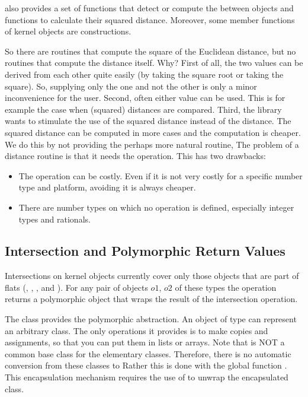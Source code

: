 {\cgal} also provides a set of functions that detect or compute the
 between objects
and functions to calculate their squared
distance.  Moreover, some
member functions of kernel objects are constructions.

So there are routines that compute the square of the Euclidean
distance, but no routines that compute the distance itself. Why?
First of all, the two values can be derived from each other quite
easily (by taking the square root or taking the square). So, supplying
only the one and not the other is only a minor inconvenience for the
user.  Second, often either value can be used. This is for example the
case when (squared) distances are compared.  Third, the library wants
to stimulate the use of the squared distance instead of the distance.
The squared distance can be computed in more cases and the computation
is cheaper.  We do this by not providing the perhaps more natural
routine, The problem of a distance routine is that it needs the
 operation.  This has two drawbacks:
\begin{itemize}
\item The  operation can be costly. Even if it is not
  very costly for a specific number type and platform, avoiding it is
  always cheaper.
\item There are number types on which no  operation is
  defined, especially integer types and rationals.
\end{itemize}

\subsection{Intersection and Polymorphic Return Values}

Intersections on kernel objects currently cover only those objects
that are part of flats (, ,
, and ).  For any pair of objects
$o1$, $o2$ of these types the operation 
returns a polymorphic object that wraps the result of the intersection
operation.

The class  provides the polymorphic abstraction.  An
object  of type  can represent an arbitrary
class. The only operations it provides is to make copies and
assignments, so that you can put them in lists or arrays. Note that
 is NOT a common base class for the elementary classes.
Therefore, there is no automatic conversion from these classes to
 Rather this is done with the global function
. This encapsulation mechanism requires the use of
 to unwrap the encapsulated class.

